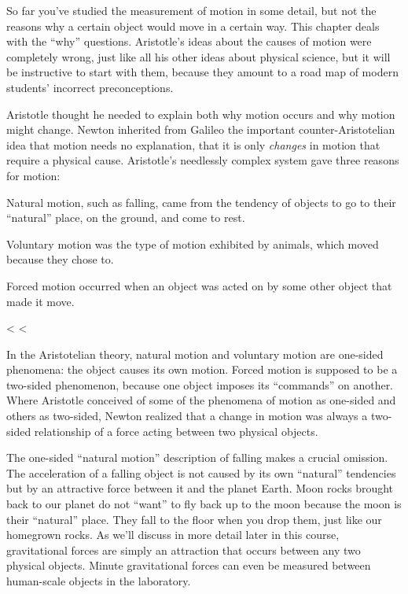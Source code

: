 So far you've studied the measurement of motion in some
detail, but not the reasons why a certain object would move
in a certain way. This chapter deals with the ``why''
questions. Aristotle's ideas about the causes of motion were
completely wrong, just like all his other ideas about
physical science, but it will be instructive to start with
them, because they amount to a road map of modern students'
incorrect preconceptions.

Aristotle thought he needed to explain both why motion
occurs and why motion might change. Newton inherited from
Galileo the important counter-Aristotelian idea that motion
needs no explanation, that it is only \emph{changes} in
motion that require a physical cause. Aristotle's needlessly
complex system gave three reasons for motion:

\begin{indentedblock}
Natural motion, such as falling, came from the tendency of
objects to go to their ``natural'' place, on the ground, and come to rest.

\noindent Voluntary motion was the type of motion exhibited by
animals, which moved because they chose to.

\noindent Forced motion occurred when an object was acted on by some
other object that made it move.
\end{indentedblock}

<%
<%

In the Aristotelian theory, natural motion and voluntary
motion are one-sided phenomena: the object causes its own
motion. Forced motion is supposed to be a two-sided
phenomenon, because one object imposes its ``commands'' on
another. Where Aristotle conceived of some of the phenomena
of motion as one-sided and others as two-sided, Newton
realized that a change in motion was always a two-sided
relationship of a force acting between two physical objects.

The one-sided ``natural motion'' description of falling
makes a crucial omission. The acceleration of a falling
object is not caused by its own ``natural'' tendencies but
by an attractive force between it and the planet Earth. Moon
rocks brought back to our planet do not ``want'' to fly back
up to the moon because the moon is their ``natural'' place.
They fall to the floor when you drop them, just like our
homegrown rocks. As we'll discuss in more detail later in
this course, gravitational forces are simply an attraction
that occurs between any two physical objects. Minute
gravitational forces can even be measured between human-scale
objects in the laboratory.


